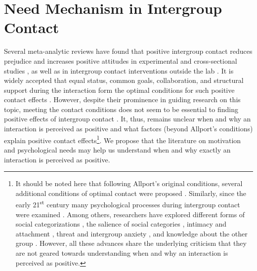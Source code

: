 \documentclass[man, 12pt, a4paper, mask]{apa7}
\theoremstyle{break}
\theoremstyle{plain}
\begin{document}
\section{Need Mechanism in Intergroup Contact}
Several meta-analytic reviews have found that positive intergroup contact reduces prejudice and increases positive attitudes in experimental and cross-sectional studies \citep[][]{Tropp2005, Pettigrew2006, Davies2011}, as well as in intergroup contact interventions outside the lab \citep[][]{Beelmann2014, Lemmer2015}. It is widely accepted that equal status, common goals, collaboration, and structural support during the interaction form the optimal conditions for such positive contact effects \citep[][]{Allport1954b, Pettigrew1969}. However, despite their prominence in guiding research on this topic, meeting the contact conditions does not seem to be essential to finding positive effects of intergroup contact \citep[][]{Pettigrew2006}. It, thus, remains unclear when and why an interaction is perceived as positive and what factors (beyond Allport's conditions) explain positive contact effects\footnote{It should be noted here that following Allport's original conditions, several additional conditions of optimal contact were proposed \citep[for a critical discussion see][]{Pettigrew1986}. Similarly, since the early 21\textsuperscript{st} century many psychological processes during intergroup contact were examined \citep[e.g. see,][]{Paolini2021}. Among others, researchers have explored different forms of social categorizations \citep[][]{Pettigrew1998}, the salience of social categories \citep[][]{Brown2005}, intimacy \citep[e.g.,][]{Marinucci2021} and attachment \citep[e.g.,][]{Tropp2021}, threat and intergroup anxiety \citep[e.g.,][]{Stephan2008, Paolini2004}, and knowledge about the other group \citep[][]{Pettigrew2008c}. However, all these advances share the underlying criticism that they are not geared towards understanding when and why an interaction is perceived as positive.}. We propose that the literature on motivation and psychological needs may help us understand when and why exactly an interaction is perceived as positive.
\end{document}
